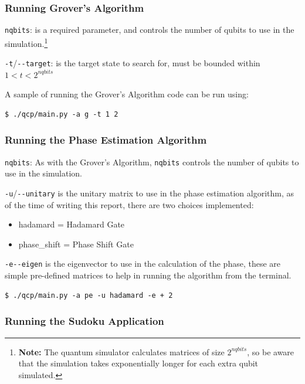 \documentclass{article}
\begin{document}
\subsubsection{Running Grover's Algorithm}

\verb#nqbits#: is a required parameter, and controls the number of qubits to use in the simulation.\footnote{\textbf{Note:}
The quantum simulator calculates matrices of size $2^{nqbits}$, so be aware that the simulation takes exponentially longer for each extra qubit simulated.
}

\medskip

\verb#-t#/\verb#--target#: is the target state to search for, must be bounded within $1 < t < 2^{nqbits}$

A sample of running the Grover's Algorithm code can be run using:

\begin{verbatim}
$ ./qcp/main.py -a g -t 1 2
\end{verbatim}

\subsubsection{Running the Phase Estimation Algorithm}

\verb#nqbits#: As with the Grover's Algorithm, \verb#nqbits# controls the number of qubits to use in the simulation.

\medskip

\verb#-u#/\verb#--unitary# is the unitary matrix to use in the phase estimation algorithm, as of the time of writing this report, there are two choices implemented:
\begin{itemize}
    \item hadamard = Hadamard Gate
    \item phase\_shift = Phase Shift Gate
\end{itemize}

\medskip

\verb#-e#\verb#--eigen# is the eigenvector to use in the calculation of the phase, these are simple pre-defined matrices to help in running the algorithm from the terminal.

\begin{verbatim}
$ ./qcp/main.py -a pe -u hadamard -e + 2
\end{verbatim}

\subsubsection{Running the Sudoku Application}
\end{document}
